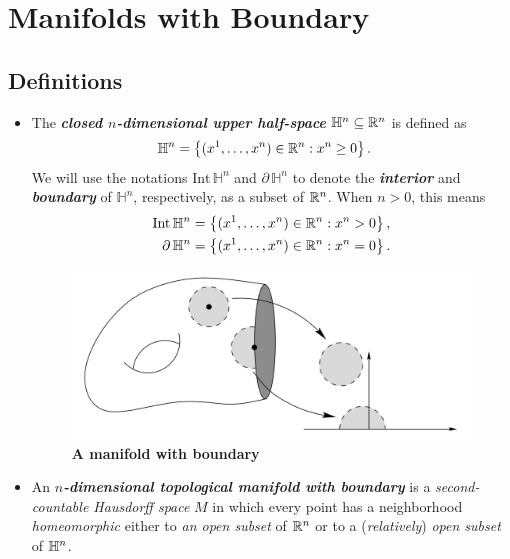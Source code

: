 \documentclass[11pt]{article}
\begin{document}
\section{Manifolds with Boundary}
\subsection{Definitions}
\begin{itemize}
\item \begin{definition}
The \emph{\textbf{closed $n$-dimensional upper half-space}} $\mathbb{H}^n \subseteq {\mathbb R}^n$ is defined as
\begin{align*}
\mathbb{H}^n &= \left\{(x^1, \ldots, x^n) \in {\mathbb R}^n: x^n \ge 0\right\}. 
\end{align*} We will use the notations $\text{Int}\, \mathbb{H}^n$ and $\partial\, \mathbb{H}^n$ to denote the \emph{\textbf{interior}} and \emph{\textbf{boundary}} of $\mathbb{H}^n$, respectively, as a subset of ${\mathbb R}^n$. When $n > 0$, this means
\begin{align*}
\text{Int}\, \mathbb{H}^n &= \left\{(x^1, \ldots, x^n) \in {\mathbb R}^n: x^n > 0\right\}, \\
\partial\, \mathbb{H}^n &= \left\{(x^1, \ldots, x^n) \in {\mathbb R}^n: x^n = 0\right\}.
\end{align*}
\end{definition}

\begin{figure}
\begin{minipage}[t]{1\linewidth}
  \centering
  \centerline{\includegraphics[scale = 0.4]{manifolds_with_boundary.png}}
\end{minipage}
\caption{\footnotesize{\textbf{A manifold with boundary \citep{lee2003introduction}}}}
\label{fig: manifolds_with_boundary}
\end{figure}

\item 
\begin{definition}
An \emph{\textbf{$n$-dimensional topological manifold with boundary}} is a \emph{second-countable Hausdorff space} $M$ in which every point has a neighborhood \emph{homeomorphic} either to \emph{an open subset} of ${\mathbb R}^n$ or to a (\emph{relatively}) \emph{open subset} of ${\mathbb H}^n$.
\end{definition}


\end{itemize}
\end{document}
